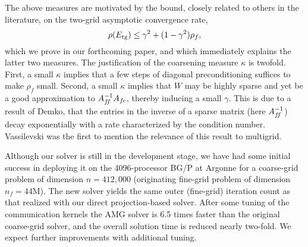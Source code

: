 \documentclass{report}
\begin{document}
The above measures are motivated by the bound, closely related to others in the
literature, on the two-grid asymptotic convergence
rate, \[ \rho(E_{\text{tg}}) \le \gamma^2 + (1 - \gamma^2) \rho_f, \] which we prove in
our forthcoming paper, and which immediately explains the latter two
measures. The justification of the coarsening measure $\kappa$ is
twofold. First, a small $\kappa$ implies that a few steps of diagonal
preconditioning suffices to make $\rho_f$ small. Second, a small $\kappa$
implies that $W$ may be highly sparse and yet be a good approximation to
$A_{f\hspace{-0.1667 em}f}^{-1} A_{f\hspace{-0.0833 em}c}$, thereby inducing a small $\gamma$. This is due to a result
of Demko, that the entries in the inverse of a sparse matrix
(here $A_{f\hspace{-0.1667 em}f}^{-1}$) decay exponentially with a rate characterized by the
condition number. Vassilevski was the first to mention the
relevance of this result to multigrid.

Although our solver is still in the development stage, we have had some initial
success in deploying it on the 4096-processor BG/P at Argonne for a coarse-grid
problem of dimension $n=412,000$ (originating fine-grid problem of dimension
$n_f = 44$M). The new solver yields the same outer (fine-grid) iteration count
as that realized with our direct projection-based solver. After
some tuning of the communication kernels the AMG solver is 6.5 times faster
than the original coarse-grid solver, and the overall solution time is reduced
nearly two-fold. We expect further improvements with additional tuning.
\end{document}
